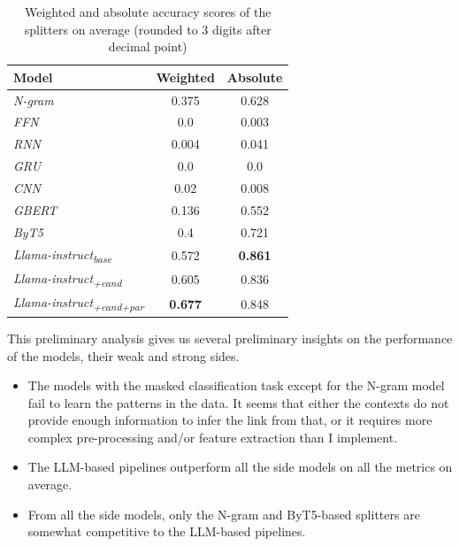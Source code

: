 \documentclass[11pt]{article}
\begin{document}
\begin{table}[htb!]
    \centering
    \begin{tabular}{@{}lcc@{}}
        \toprule
        Model & Weighted & Absolute \\ \midrule
        \textit{N-gram} & 0.375 & 0.628 \\ \cmidrule{1-3}
        \textit{FFN} & 0.0 & 0.003 \\
        \textit{RNN} & 0.004 & 0.041 \\
        \textit{GRU} & 0.0 & 0.0 \\
        \textit{CNN} & 0.02 & 0.008 \\ \cmidrule{1-3}
        \textit{GBERT} & 0.136 & 0.552 \\
        \textit{ByT5} & 0.4 & 0.721 \\ \midrule
        \textit{Llama-instruct\textsubscript{base}}  & 0.572 & \textbf{0.861} \\
        \textit{Llama-instruct\textsubscript{+cand}} & 0.605 & 0.836 \\
        \textit{Llama-instruct\textsubscript{+cand+par}} & \textbf{0.677} & 0.848 \\ 
        \bottomrule
    \end{tabular}
    \caption{Weighted and absolute accuracy scores of the splitters on average (rounded to 3 digits after decimal point)}
    \label{tab:avg_scores}
\end{table}


This preliminary analysis gives us several preliminary insights on the performance of the models, their weak and strong sides.

\begin{itemize}
    
    \item The models with the masked classification task except for the N-gram model fail to learn the patterns in the data. It seems that either the contexts do not provide enough information to infer the link from that, or it requires more complex pre-processing and/or feature extraction than I implement.

    \item The LLM-based pipelines outperform all the side models on all the metrics on average.

    \item From all the side models, only the N-gram and ByT5-based splitters are somewhat competitive to the LLM-based pipelines.
    
\end{itemize}
\end{document}
